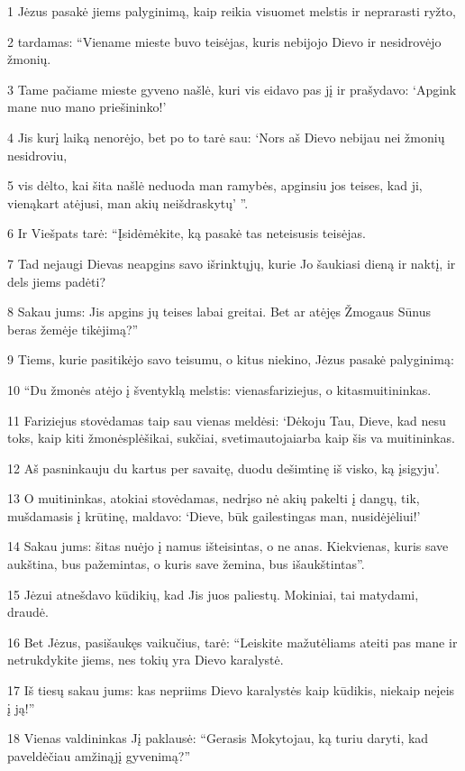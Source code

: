 \par 1 Jėzus pasakė jiems palyginimą, kaip reikia visuomet melstis ir neprarasti ryžto, 
\par 2 tardamas: “Viename mieste buvo teisėjas, kuris nebijojo Dievo ir nesidrovėjo žmonių. 
\par 3 Tame pačiame mieste gyveno našlė, kuri vis eidavo pas jį ir prašydavo: ‘Apgink mane nuo mano priešininko!’ 
\par 4 Jis kurį laiką nenorėjo, bet po to tarė sau: ‘Nors aš Dievo nebijau nei žmonių nesidroviu, 
\par 5 vis dėlto, kai šita našlė neduoda man ramybės, apginsiu jos teises, kad ji, vienąkart atėjusi, man akių neišdraskytų’ ”. 
\par 6 Ir Viešpats tarė: “Įsidėmėkite, ką pasakė tas neteisusis teisėjas. 
\par 7 Tad nejaugi Dievas neapgins savo išrinktųjų, kurie Jo šaukiasi dieną ir naktį, ir dels jiems padėti? 
\par 8 Sakau jums: Jis apgins jų teises labai greitai. Bet ar atėjęs Žmogaus Sūnus beras žemėje tikėjimą?” 
\par 9 Tiems, kurie pasitikėjo savo teisumu, o kitus niekino, Jėzus pasakė palyginimą: 
\par 10 “Du žmonės atėjo į šventyklą melstis: vienas­fariziejus, o kitas­muitininkas. 
\par 11 Fariziejus stovėdamas taip sau vienas meldėsi: ‘Dėkoju Tau, Dieve, kad nesu toks, kaip kiti žmonės­plėšikai, sukčiai, svetimautojai­arba kaip šis va muitininkas. 
\par 12 Aš pasninkauju du kartus per savaitę, duodu dešimtinę iš visko, ką įsigyju’. 
\par 13 O muitininkas, atokiai stovėdamas, nedrįso nė akių pakelti į dangų, tik, mušdamasis į krūtinę, maldavo: ‘Dieve, būk gailestingas man, nusidėjėliui!’ 
\par 14 Sakau jums: šitas nuėjo į namus išteisintas, o ne anas. Kiekvienas, kuris save aukština, bus pažemintas, o kuris save žemina, bus išaukštintas”. 
\par 15 Jėzui atnešdavo kūdikių, kad Jis juos paliestų. Mokiniai, tai matydami, draudė. 
\par 16 Bet Jėzus, pasišaukęs vaikučius, tarė: “Leiskite mažutėliams ateiti pas mane ir netrukdykite jiems, nes tokių yra Dievo karalystė. 
\par 17 Iš tiesų sakau jums: kas nepriims Dievo karalystės kaip kūdikis, niekaip neįeis į ją!” 
\par 18 Vienas valdininkas Jį paklausė: “Gerasis Mokytojau, ką turiu daryti, kad paveldėčiau amžinąjį gyvenimą?” 
